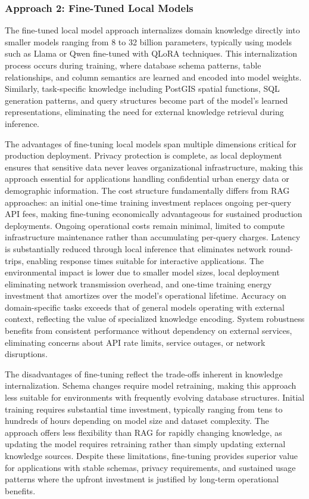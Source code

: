 \subsubsection{Approach 2: Fine-Tuned Local Models}

The fine-tuned local model approach internalizes domain knowledge directly into smaller models ranging from 8 to 32 billion parameters, typically using models such as Llama or Qwen fine-tuned with QLoRA techniques. This internalization process occurs during training, where database schema patterns, table relationships, and column semantics are learned and encoded into model weights. Similarly, task-specific knowledge including PostGIS spatial functions, SQL generation patterns, and query structures become part of the model's learned representations, eliminating the need for external knowledge retrieval during inference.

The advantages of fine-tuning local models span multiple dimensions critical for production deployment. Privacy protection is complete, as local deployment ensures that sensitive data never leaves organizational infrastructure, making this approach essential for applications handling confidential urban energy data or demographic information. The cost structure fundamentally differs from RAG approaches: an initial one-time training investment replaces ongoing per-query API fees, making fine-tuning economically advantageous for sustained production deployments. Ongoing operational costs remain minimal, limited to compute infrastructure maintenance rather than accumulating per-query charges. Latency is substantially reduced through local inference that eliminates network round-trips, enabling response times suitable for interactive applications. The environmental impact is lower due to smaller model sizes, local deployment eliminating network transmission overhead, and one-time training energy investment that amortizes over the model's operational lifetime. Accuracy on domain-specific tasks exceeds that of general models operating with external context, reflecting the value of specialized knowledge encoding. System robustness benefits from consistent performance without dependency on external services, eliminating concerns about API rate limits, service outages, or network disruptions.

The disadvantages of fine-tuning reflect the trade-offs inherent in knowledge internalization. Schema changes require model retraining, making this approach less suitable for environments with frequently evolving database structures. Initial training requires substantial time investment, typically ranging from tens to hundreds of hours depending on model size and dataset complexity. The approach offers less flexibility than RAG for rapidly changing knowledge, as updating the model requires retraining rather than simply updating external knowledge sources. Despite these limitations, fine-tuning provides superior value for applications with stable schemas, privacy requirements, and sustained usage patterns where the upfront investment is justified by long-term operational benefits.

